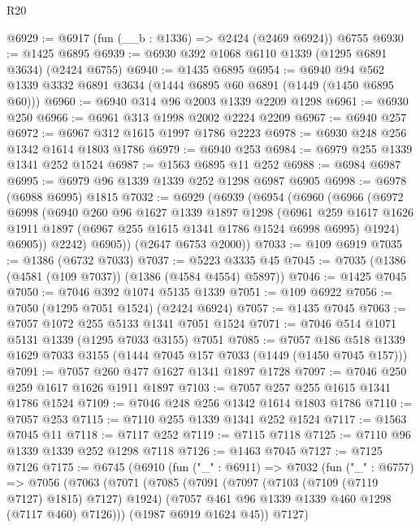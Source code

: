 \begin{lexlean}{R20}
\begin{coremodule}
@6929 := @6917 (fun (__b : @1336) => @2424 (@2469 @6924)) @6755
@6930 := @1425 @6895
@6939 := @6930 @392 @1068 @6110 @1339 (@1295 @6891 @3634) (@2424 @6755)
@6940 := @1435 @6895
@6954 := @6940 @94 @562 @1339 @3332 @6891 @3634 (@1444 @6895 @60 @6891 (@1449 (@1450 @6895 @60)))
@6960 := @6940 @314 @96 @2003 @1339 @2209 @1298
@6961 := @6930 @250
@6966 := @6961 @313 @1998 @2002 @2224 @2209
@6967 := @6940 @257
@6972 := @6967 @312 @1615 @1997 @1786 @2223
@6978 := @6930 @248 @256 @1342 @1614 @1803 @1786
@6979 := @6940 @253
@6984 := @6979 @255 @1339 @1341 @252 @1524
@6987 := @1563 @6895 @11 @252
@6988 := @6984 @6987
@6995 := @6979 @96 @1339 @1339 @252 @1298 @6987 @6905
@6998 := @6978 (@6988 @6995) @1815
@7032 := @6929
    (@6939
      (@6954
        (@6960
          (@6966
            (@6972
              @6998
              (@6940
                @260
                @96
                @1627
                @1339
                @1897
                @1298
                (@6961
                  @259
                  @1617
                  @1626
                  @1911
                  @1897
                  (@6967 @255 @1615 @1341 @1786 @1524 @6998 @6995)
                  @1924)
                @6905))
            @2242)
          @6905))
      (@2647 @6753 @2000))
@7033 := @109 @6919
@7035 := @1386 (@6732 @7033)
@7037 := @5223 @3335 @45
@7045 := @7035 (@1386 (@4581 (@109 @7037)) (@1386 (@4584 @4554) @5897))
@7046 := @1425 @7045
@7050 := @7046 @392 @1074 @5135 @1339
@7051 := @109 @6922
@7056 := @7050 (@1295 @7051 @1524) (@2424 @6924)
@7057 := @1435 @7045
@7063 := @7057 @1072 @255 @5133 @1341 @7051 @1524
@7071 := @7046 @514 @1071 @5131 @1339 (@1295 @7033 @3155) @7051
@7085 := @7057 @186 @518 @1339 @1629 @7033 @3155 (@1444 @7045 @157 @7033 (@1449 (@1450 @7045 @157)))
@7091 := @7057 @260 @477 @1627 @1341 @1897 @1728
@7097 := @7046 @250 @259 @1617 @1626 @1911 @1897
@7103 := @7057 @257 @255 @1615 @1341 @1786 @1524
@7109 := @7046 @248 @256 @1342 @1614 @1803 @1786
@7110 := @7057 @253
@7115 := @7110 @255 @1339 @1341 @252 @1524
@7117 := @1563 @7045 @11
@7118 := @7117 @252
@7119 := @7115 @7118
@7125 := @7110 @96 @1339 @1339 @252 @1298 @7118
@7126 := @1463 @7045
@7127 := @7125 @7126
@7175 := @6745
    (@6910
      (fun ("_" : @6911) =>
      @7032
        (fun ("_" : @6757) =>
        @7056
          (@7063
            (@7071
              (@7085
                (@7091
                  (@7097 (@7103 (@7109 (@7119 @7127) @1815) @7127) @1924)
                  (@7057 @461 @96 @1339 @1339 @460 @1298 (@7117 @460) @7126)))
              (@1987 @6919 @1624 @45))
            @7127)

\end{coremodule}
\end{lexlean}
